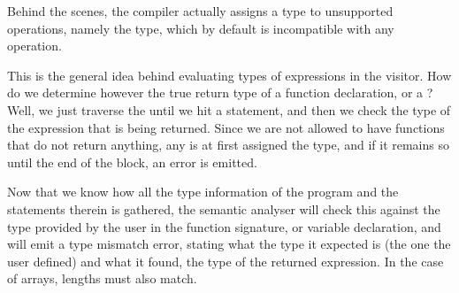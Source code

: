 Behind the scenes, the compiler actually assigns a type to unsupported
operations, namely the  type, which by default is incompatible
with any operation.

This is the general idea behind evaluating types of expressions in the
 visitor. How do we determine however the true return
type of a function declaration, or a ? Well, we just traverse the
 until we hit a  statement, and then we check the type of
the expression that is being returned. Since we are not allowed to have
functions that do not return anything, any  is at first assigned the
 type, and if it remains so until the end of the block, an error is
emitted.

Now that we know how all the type information of the program and the statements
therein is gathered, the semantic analyser will check this against the type
provided by the user in the function signature, or variable declaration, and
will emit a type mismatch error, stating what the type it expected is (the one
the user defined) and what it found, the type of the returned expression. In the
case of arrays, lengths must also match.
